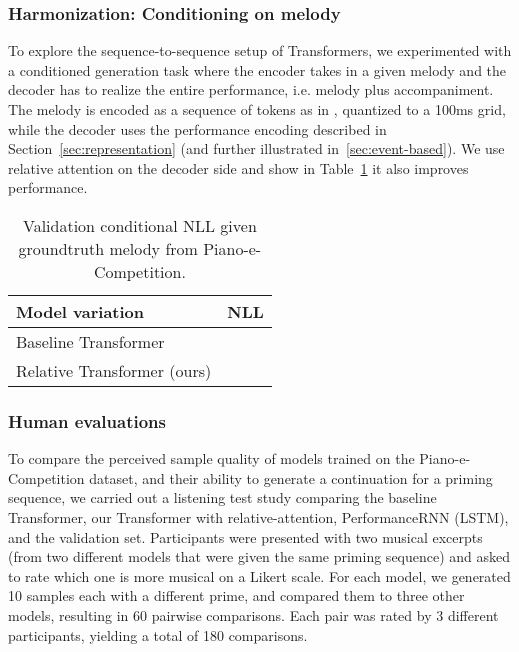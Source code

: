 \documentclass{article} \usepackage{iclr2019_conference,times}
\begin{document}
\subsubsection{Harmonization: Conditioning on melody}
\begin{table}[h]
\begin{minipage}[c]{0.60\columnwidth}
To explore the sequence-to-sequence setup of Transformers, we experimented with a conditioned generation task where the encoder takes in a given melody and the decoder has to realize the entire performance, i.e. melody plus accompaniment.  The melody is encoded as a sequence of tokens as in \citet{waite2016generating}, quantized to a 100ms grid, while the decoder uses the performance encoding described in Section~\ref{sec:representation} (and further illustrated in~\ref{sec:event-based}).  We use relative attention on the 
decoder side and show in Table~\ref{table:melody_nll} it also improves performance.
\end{minipage}
\hspace{0.3cm}
\begin{minipage}[c]{0.37\columnwidth}


\caption{Validation conditional NLL given groundtruth melody from Piano-e-Competition.}
\label{table:melody_nll}
\centering
\begin{tabular}{ll}
\toprule
Model variation     & NLL\\\midrule
Baseline Transformer &  \\
Relative Transformer (ours) &  \\
\bottomrule
\end{tabular}

\end{minipage}
\end{table}



\vskip -0.6in
\subsubsection{Human evaluations}
\label{sec:listening}
To compare the perceived sample quality of models trained on the Piano-e-Competition dataset, and their ability to generate a continuation for a priming sequence, we carried out a listening test study comparing the baseline Transformer, our Transformer with relative-attention, PerformanceRNN (LSTM), and the validation set. Participants were presented with two musical excerpts (from two different models that were given the same priming sequence) and asked to rate which one is more musical on a Likert scale.  For each model, we generated 10 samples each with a different prime, and compared them to three other models, resulting in 60 pairwise comparisons.  Each pair was rated by 3 different participants, yielding a total of 180 comparisons.   
\end{document}
